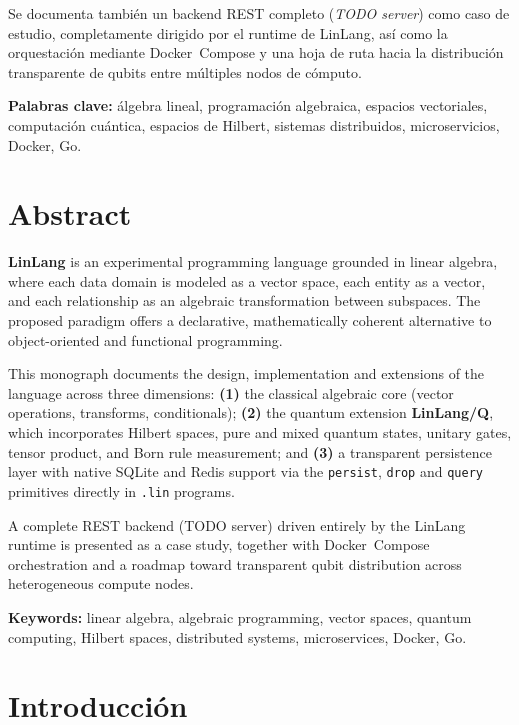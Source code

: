 \documentclass[12pt, a4paper, openany]{report}
\theoremstyle{definition}
\newcommand{\linlang}{\textbf{LinLang}}
\newcommand{\linlangQ}{\textbf{LinLang/Q}}
\begin{document}
Se documenta también un backend REST completo (\emph{TODO server}) como caso de estudio, completamente dirigido por el runtime de LinLang, así como la orquestación mediante Docker~Compose y una hoja de ruta hacia la distribución transparente de qubits entre múltiples nodos de cómputo.

\bigskip\noindent\textbf{Palabras clave:} álgebra lineal, programación algebraica, espacios vectoriales, computación cuántica, espacios de Hilbert, sistemas distribuidos, microservicios, Docker, Go.

\chapter*{Abstract}

\linlang{} is an experimental programming language grounded in linear algebra, where each data domain is modeled as a vector space, each entity as a vector, and each relationship as an algebraic transformation between subspaces. The proposed paradigm offers a declarative, mathematically coherent alternative to object-oriented and functional programming.

This monograph documents the design, implementation and extensions of the language across three dimensions: \textbf{(1)} the classical algebraic core (vector operations, transforms, conditionals); \textbf{(2)} the quantum extension \linlangQ{}, which incorporates Hilbert spaces, pure and mixed quantum states, unitary gates, tensor product, and Born rule measurement; and \textbf{(3)} a transparent persistence layer with native SQLite and Redis support via the \texttt{persist}, \texttt{drop} and \texttt{query} primitives directly in \texttt{.lin} programs.

A complete REST backend (TODO server) driven entirely by the LinLang runtime is presented as a case study, together with Docker~Compose orchestration and a roadmap toward transparent qubit distribution across heterogeneous compute nodes.

\bigskip\noindent\textbf{Keywords:} linear algebra, algebraic programming, vector spaces, quantum computing, Hilbert spaces, distributed systems, microservices, Docker, Go.

\cleardoublepage

\tableofcontents
\cleardoublepage

\chapter{Introducción}
\label{ch:intro}
\end{document}
